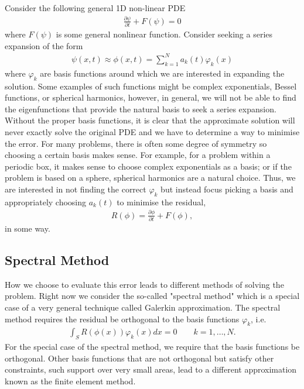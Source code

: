 Consider the following general 1D non-linear PDE
\begin{align}
\frac{\partial \psi}{\partial t} + F(\psi) = 0
\end{align}
where $F(\psi)$ is some general nonlinear function. Consider seeking a series expansion of the form
\begin{align}
\psi(x,t)\approx \phi(x,t) = \sum_{k=1}^{N}a_{k}(t)\varphi_{k}(x)
\end{align}
where $\varphi_{k}$ are basis functions around which we are interested in expanding the solution. Some examples of such functions might be complex exponentials, Bessel functions, or spherical harmonics, however, in general,  we will not be able to find the eigenfunctions that provide the natural basis to seek a series expansion. Without the proper basis functions, it is clear that the approximate solution will never exactly solve the original PDE and we have to determine a way to minimise the error. For many problems, there is often some degree of symmetry so choosing a certain basis makes sense. For example, for a problem within a periodic box, it makes sense to choose complex exponentials as a basis; or if the problem is based on a sphere, spherical harmonics are a natural choice. Thus, we are interested in not finding the correct $\varphi_{k}$ but instead focus picking a basis and appropriately choosing $a_{k}(t)$ to minimise the residual, 
\begin{align}
R(\phi) = \frac{\partial \phi}{\partial t} + F(\phi),
\end{align}
in some way.  

\subsection{Spectral Method}
How we choose to evaluate this error leads to different methods of solving the problem. Right now we consider the so-called "spectral method" which is a special case of a very general technique called Galerkin approximation.  The spectral method requires the residual be orthogonal to the basis functions $\varphi_{k}$, i.e.
\begin{align}
\int_{S}R(\phi(x))\varphi_{k}(x)dx = 0 \qquad k=1,\ldots,N.
\end{align}
For the special case of the spectral method, we require that the basis functions be orthogonal. Other basis functions that are not orthogonal but satisfy other constraints, such support over very small areas, lead to a different approximation known as the finite element method\cite{durran}.

